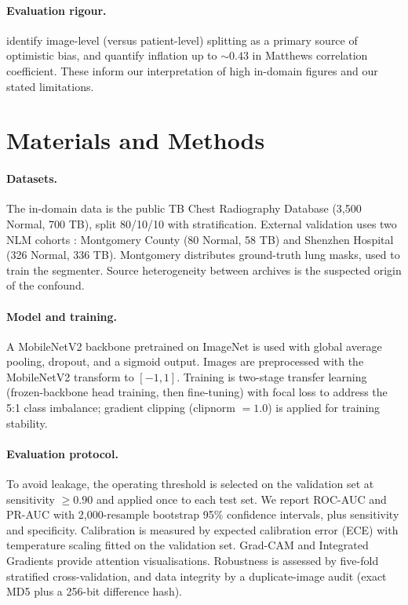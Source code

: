 \documentclass{article}
\begin{document}
\paragraph{Evaluation rigour.}
\citet{rouzrokh2022mitigating} identify image-level (versus patient-level) splitting as a primary
source of optimistic bias, and \citet{tampu2022inflation} quantify inflation up to ${\sim}0.43$ in
Matthews correlation coefficient. These inform our interpretation of high in-domain figures and our
stated limitations.

\section{Materials and Methods}

\paragraph{Datasets.}
The in-domain data is the public TB Chest Radiography Database (3{,}500 Normal, 700 TB), split
80/10/10 with stratification. External validation uses two NLM cohorts \citep{jaeger2014two}:
Montgomery County (80 Normal, 58 TB) and Shenzhen Hospital (326 Normal, 336 TB). Montgomery
distributes ground-truth lung masks, used to train the segmenter. Source heterogeneity between
archives is the suspected origin of the confound.

\paragraph{Model and training.}
A MobileNetV2 backbone \citep{sandler2018mobilenetv2} pretrained on ImageNet is used with global
average pooling, dropout, and a sigmoid output. Images are preprocessed with the MobileNetV2
transform to $[-1, 1]$. Training is two-stage transfer learning (frozen-backbone head training,
then fine-tuning) with focal loss \citep{lin2017focal} to address the 5:1 class imbalance; gradient
clipping (clipnorm $= 1.0$) is applied for training stability.

\paragraph{Evaluation protocol.}
To avoid leakage, the operating threshold is selected on the validation set at sensitivity
$\geq 0.90$ and applied once to each test set. We report ROC-AUC and PR-AUC with 2{,}000-resample
bootstrap 95\% confidence intervals, plus sensitivity and specificity. Calibration is measured by
expected calibration error (ECE) with temperature scaling \citep{guo2017calibration} fitted on the
validation set. Grad-CAM \citep{selvaraju2017gradcam} and Integrated Gradients
\citep{sundararajan2017axiomatic} provide attention visualisations. Robustness is assessed by
five-fold stratified cross-validation, and data integrity by a duplicate-image audit (exact MD5
plus a 256-bit difference hash).
\end{document}
